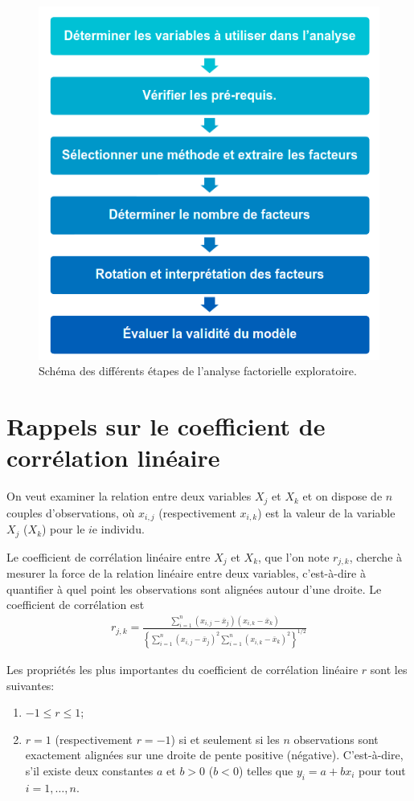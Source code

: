 \documentclass[
  11pt,
  letterpaper,
]{book}
\providecommand{\tightlist}{%
  \setlength{\itemsep}{0pt}\setlength{\parskip}{0pt}}
\theoremstyle{definition}
\theoremstyle{definition}
\theoremstyle{definition}
\theoremstyle{definition}
\theoremstyle{remark}
\begin{document}
\begin{figure}

{\centering \includegraphics[width=0.5\linewidth]{figures/01-facto-e17} 

}

\caption{Schéma des différents étapes de l'analyse factorielle exploratoire.}\label{fig:fig1p17}
\end{figure}

\hypertarget{rappels-sur-le-coefficient-de-corruxe9lation-linuxe9aire}{%
\section{Rappels sur le coefficient de corrélation linéaire}\label{rappels-sur-le-coefficient-de-corruxe9lation-linuxe9aire}}

On veut examiner la relation entre deux variables \(X_j\) et \(X_k\) et on dispose de \(n\) couples d'observations, où \(x_{i, j}\) (respectivement \(x_{i, k}\)) est la valeur de la variable \(X_j\) (\(X_k\)) pour le \(i\)e individu.

Le coefficient de corrélation linéaire entre \(X_j\) et \(X_k\), que l'on note \(r_{j, k}\), cherche à mesurer la force de la relation linéaire entre deux variables, c'est-à-dire à quantifier à quel point les observations sont alignées autour d'une droite. Le coefficient de corrélation est
\begin{align*}
r_{j, k} = \frac{\sum_{i=1}^n (x_{i, j}-\overline{x}_j)(x_{i, k} -\overline{x}_{k})}{\left\{\sum_{i=1}^n (x_{i, j}-\overline{x}_j)^2 \sum_{i=1}^n(x_{i, k} -\overline{x}_{k})^2\right\}^{1/2}}
\end{align*}

Les propriétés les plus importantes du coefficient de corrélation linéaire \(r\) sont les suivantes:

\begin{enumerate}
\def\labelenumi{\arabic{enumi})}
\tightlist
\item
  \(-1 \leq r \leq 1\);
\item
  \(r=1\) (respectivement \(r=-1\)) si et seulement si les \(n\) observations sont exactement alignées sur une droite de pente positive (négative). C'est-à-dire, s'il existe deux constantes \(a\) et \(b>0\) (\(b<0\)) telles que \(y_i=a+b x_i\) pour tout \(i=1, \ldots, n\).
\end{enumerate}
\end{document}
